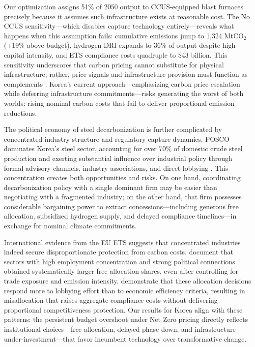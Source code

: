 \documentclass[preprint,1p,authoryear]{elsarticle}
\begin{document}
Our optimization assigns 51\% of 2050 output to CCUS-equipped blast furnaces precisely because it assumes such infrastructure exists at reasonable cost. The No CCUS sensitivity—which disables capture technology entirely—reveals what happens when this assumption fails: cumulative emissions jump to 1,324 MtCO$_2$ (+19\% above budget), hydrogen DRI expands to 36\% of output despite high capital intensity, and ETS compliance costs quadruple to \$43 billion. This sensitivity underscores that carbon pricing cannot substitute for physical infrastructure; rather, price signals and infrastructure provision must function as complements \citep{bataille2018role, Neuhoff2019CCfD}. Korea's current approach—emphasizing carbon price escalation while deferring infrastructure commitments—risks generating the worst of both worlds: rising nominal carbon costs that fail to deliver proportional emission reductions.

The political economy of steel decarbonization is further complicated by concentrated industry structure and regulatory capture dynamics. POSCO dominates Korea's steel sector, accounting for over 70\% of domestic crude steel production and exerting substantial influence over industrial policy through formal advisory channels, industry associations, and direct lobbying \citep{KOSIS2023}. This concentration creates both opportunities and risks. On one hand, coordinating decarbonization policy with a single dominant firm may be easier than negotiating with a fragmented industry; on the other hand, that firm possesses considerable bargaining power to extract concessions—including generous free allocation, subsidized hydrogen supply, and delayed compliance timelines—in exchange for nominal climate commitments.

International evidence from the EU ETS suggests that concentrated industries indeed secure disproportionate protection from carbon costs. \citet{martin2016industry} document that sectors with high employment concentration and strong political connections obtained systematically larger free allocation shares, even after controlling for trade exposure and emission intensity. \citet{fowlie2016carbon} demonstrate that these allocation decisions respond more to lobbying effort than to economic efficiency criteria, resulting in misallocation that raises aggregate compliance costs without delivering proportional competitiveness protection. Our results for Korea align with these patterns: the persistent budget overshoot under Net Zero pricing directly reflects institutional choices—free allocation, delayed phase-down, and infrastructure under-investment—that favor incumbent technology over transformative change.
\end{document}
